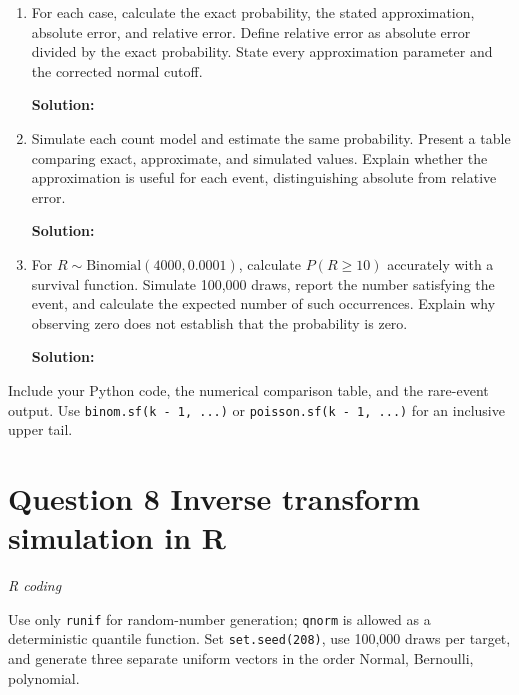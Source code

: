 \documentclass[11pt]{article}
\newcommand{\solution}{\par\medskip\noindent\textbf{Solution:}\par\vspace{0cm}}
\begin{document}
\begin{enumerate}[label=\textbf{(\alph*)}]
  \item For each case, calculate the exact probability, the stated approximation, absolute error, and relative error. Define relative error as absolute error divided by the exact probability. State every approximation parameter and the corrected normal cutoff.
  \solution

  \item Simulate each count model and estimate the same probability. Present a table comparing exact, approximate, and simulated values. Explain whether the approximation is useful for each event, distinguishing absolute from relative error.
  \solution

  \item For $R \sim \text{Binomial}(4000, 0.0001)$, calculate $P(R \geq 10)$ accurately with a survival function. Simulate 100,000 draws, report the number satisfying the event, and calculate the expected number of such occurrences. Explain why observing zero does not establish that the probability is zero.
  \solution
\end{enumerate}

Include your Python code, the numerical comparison table, and the rare-event output. Use \texttt{binom.sf(k - 1, ...)} or \texttt{poisson.sf(k - 1, ...)} for an inclusive upper tail.

\newpage
\section*{Question 8 \quad Inverse transform simulation in R}
\textit{R coding}

Use only \texttt{runif} for random-number generation; \texttt{qnorm} is allowed as a deterministic quantile function. Set \texttt{set.seed(208)}, use 100,000 draws per target, and generate three separate uniform vectors in the order Normal, Bernoulli, polynomial.
\end{document}
